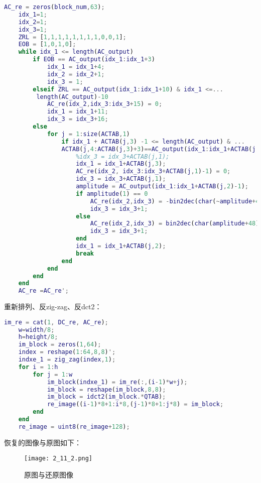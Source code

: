 \documentclass[12pt]{article}
\begin{document}
\begin{lstlisting}[language=matlab]
    AC_re = zeros(block_num,63);
    idx_1=1;
    idx_2=1;
    idx_3=1;
    ZRL = [1,1,1,1,1,1,1,1,0,0,1];
    EOB = [1,0,1,0];
    while idx_1 <= length(AC_output)
        if EOB == AC_output(idx_1:idx_1+3)
            idx_1 = idx_1+4;
            idx_2 = idx_2+1;
            idx_3 = 1;
        elseif ZRL == AC_output(idx_1:idx_1+10) & idx_1 <=... 
         length(AC_output)-10
            AC_re(idx_2,idx_3:idx_3+15) = 0;
            idx_1 = idx_1+11;
            idx_3 = idx_3+16;
        else
            for j = 1:size(ACTAB,1)
                if idx_1 + ACTAB(j,3) -1 <= length(AC_output) & ... 
                ACTAB(j,4:ACTAB(j,3)+3)==AC_output(idx_1:idx_1+ACTAB(j,3)-1) 
                    %idx_3 = idx_3+ACTAB(j,1);
                    idx_1 = idx_1+ACTAB(j,3);
                    AC_re(idx_2, idx_3:idx_3+ACTAB(j,1)-1) = 0;
                    idx_3 = idx_3+ACTAB(j,1);
                    amplitude = AC_output(idx_1:idx_1+ACTAB(j,2)-1);
                    if amplitude(1) == 0
                        AC_re(idx_2,idx_3) = -bin2dec(char(~amplitude+48));
                        idx_3 = idx_3+1;
                    else
                        AC_re(idx_2,idx_3) = bin2dec(char(amplitude+48));
                        idx_3 = idx_3+1;
                    end
                    idx_1 = idx_1+ACTAB(j,2);
                    break
                end
            end
        end
    end
    AC_re =AC_re';
\end{lstlisting}

重新排列、反zig-zag、反dct2：

\begin{lstlisting}[language=matlab]
    im_re = cat(1, DC_re, AC_re);
    w=width/8;
    h=height/8;
    im_block = zeros(1,64);
    index = reshape(1:64,8,8)';
    indxe_1 = zig_zag(index,1);
    for i = 1:h
        for j = 1:w
            im_block(indxe_1) = im_re(:,(i-1)*w+j);
            im_block = reshape(im_block,8,8);
            im_block = idct2(im_block.*QTAB);
            re_image((i-1)*8+1:i*8,(j-1)*8+1:j*8) = im_block;
        end
    end
    re_image = uint8(re_image+128);
\end{lstlisting}

恢复的图像与原图如下：

\begin{figure}[H]
    \centering
    \texttt{[image: 2\_11\_2.png]}
    \caption{原图与还原图像}
\end{figure}
\end{document}
